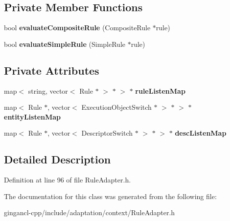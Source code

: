\subsection*{Private Member Functions}
\begin{CompactItemize}
\item 
bool \textbf{evaluateCompositeRule} (CompositeRule $\ast$rule)\label{classbr_1_1pucrio_1_1telemidia_1_1ginga_1_1ncl_1_1adaptation_1_1context_1_1RuleAdapter_5774312968950514f3509efa59575996}

\item 
bool \textbf{evaluateSimpleRule} (SimpleRule $\ast$rule)\label{classbr_1_1pucrio_1_1telemidia_1_1ginga_1_1ncl_1_1adaptation_1_1context_1_1RuleAdapter_27d402a05fd4ede9d81adcb419aa1fcf}

\end{CompactItemize}
\subsection*{Private Attributes}
\begin{CompactItemize}
\item 
map$<$ string, vector$<$ Rule $\ast$ $>$ $\ast$ $>$ $\ast$ {\bf ruleListenMap}\label{classbr_1_1pucrio_1_1telemidia_1_1ginga_1_1ncl_1_1adaptation_1_1context_1_1RuleAdapter_929107d92dde356d2e9bf62d5aeb59b9}

\item 
map$<$ Rule $\ast$, vector$<$ ExecutionObjectSwitch $\ast$ $>$ $\ast$ $>$ $\ast$ {\bf entityListenMap}\label{classbr_1_1pucrio_1_1telemidia_1_1ginga_1_1ncl_1_1adaptation_1_1context_1_1RuleAdapter_3b516ce608afcb799b276884f4019f4c}

\item 
map$<$ Rule $\ast$, vector$<$ DescriptorSwitch $\ast$ $>$ $\ast$ $>$ $\ast$ {\bf descListenMap}\label{classbr_1_1pucrio_1_1telemidia_1_1ginga_1_1ncl_1_1adaptation_1_1context_1_1RuleAdapter_07b1639233b4a247a28d1f7619b4f57b}

\end{CompactItemize}


\subsection{Detailed Description}




Definition at line 96 of file RuleAdapter.h.

The documentation for this class was generated from the following file:\begin{CompactItemize}
\item 
gingancl-cpp/include/adaptation/context/RuleAdapter.h\end{CompactItemize}
